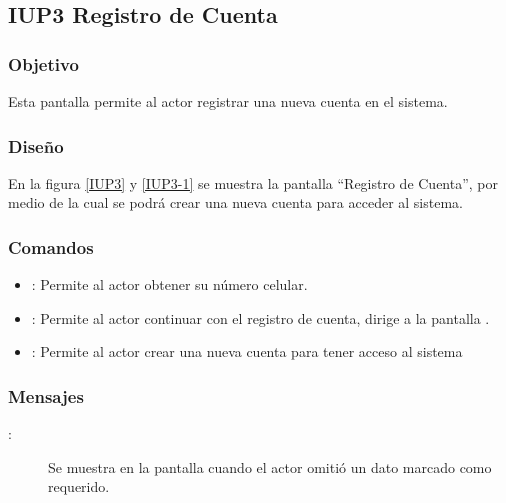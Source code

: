 \subsection{IUP3 Registro de Cuenta}
 
\subsubsection{Objetivo}

    Esta pantalla permite al actor registrar una nueva cuenta en el sistema.

\subsubsection{Diseño}

    En la figura \ref{IUP3} y \ref{IUP3-1}  se muestra la pantalla ``Registro de Cuenta'', por medio de la cual se podrá crear una nueva cuenta para  acceder al sistema. \\


\subsubsection{Comandos}
\begin{itemize}
    \item {}: Permite al actor obtener su número celular.
    \item {}: Permite al actor continuar con el registro de cuenta, dirige a la pantalla .
    \item {}: Permite al actor crear una nueva cuenta para tener acceso al sistema
    
\end{itemize}

\subsubsection{Mensajes}

\begin{description}
    \item[:] Se muestra en la pantalla  cuando el actor omitió un dato marcado como requerido.
    
\end{description}
